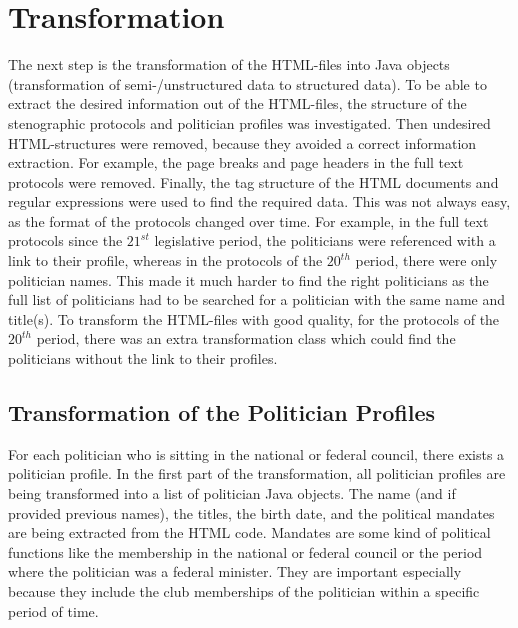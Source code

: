 \section{Transformation}
\label{sec:transformation}
The next step is the transformation of the HTML-files into Java objects (transformation of semi-/unstructured data to structured data). To be able to extract the desired information out of the HTML-files, the structure of the stenographic protocols and politician profiles was investigated. Then undesired HTML-structures were removed, because they avoided a correct information extraction. For example, the page breaks and page headers in the full text protocols were removed. Finally, the tag structure of the HTML documents and regular expressions were used to find the required data. 
This was not always easy, as the format of the protocols changed over time. For example, in the full text protocols since the $21^{st}$ legislative period, the politicians were referenced with a link to their profile, whereas in the protocols of the $20^{th}$ period, there were only politician names. This made it much harder to find the right politicians as the full list of politicians had to be searched for a politician with the same name and title(s). To transform the HTML-files with good quality, for the protocols of the $20^{th}$ period, there was an extra transformation class which could find the politicians without the link to their profiles.

\subsection{Transformation of the Politician Profiles}
For each politician who is sitting in the national or federal council, there exists a politician profile. In the first part of the transformation, all politician profiles are being transformed into a list of politician Java objects. The name (and if provided previous names), the titles, the birth date, and the political mandates are being extracted from the HTML code. Mandates are some kind of political functions like the membership in the national or federal council or the period where the politician was a federal minister. They are important especially because they include the club memberships of the politician within a specific period of time. 

